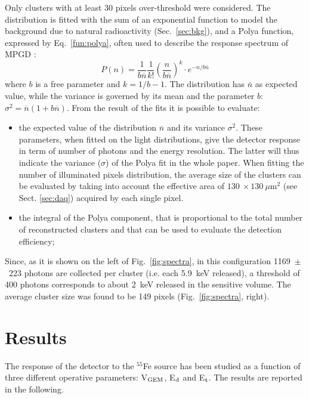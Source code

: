 \documentclass[a4paper]{jpconf}
\begin{document}
Only clusters with at least 30 pixels over-threshold were
considered. The distribution is fitted with the sum of an exponential
function to model the background due to natural radioactivity
(Sec.~\ref{sec:bkg}), and a Polya function, expressed by
Eq.~\ref{fun:polya}, often used to describe the response spectrum of
MPGD \cite{bib:rolandiblum}:
%
\begin{equation}
   P(n)=\frac{1}{b\overline{n}}\frac{1}{k!}\left(\frac{n}{b\overline{n}}\right)^k \cdot e^{-n/b\overline{n}}
\label{fun:polya}
\end{equation}
%
where $b$ is a free parameter and $k=1/b-1$. The distribution has $\overline{n}$ as expected value, while the variance is governed by its mean and the parameter $b$: $\sigma^2=\overline{n}(1+b\overline{n})$. 
From the result of the fits it is possible to evaluate:
\begin{itemize}
\item the expected value of the distribution $\overline{n}$ and its
  variance $\sigma^2$. These parameters, when fitted on the light
  distributions, give the detector response in term of number of
  photons and the energy resolution. The latter will thus indicate the
  variance ($\sigma$) of the Polya fit in the whole paper.  When
  fitting the number of illuminated pixels distribution, the average
  size of the clusters can be evaluated by taking into account the
  effective area of $130~\times 130~\mu$m$^2$ (see
  Sect. \ref{sec:daq}) acquired by each single pixel.
\item the integral of the Polya component, that is proportional to the
  total number of reconstructed clusters and that can be used to
  evaluate the detection efficiency;
\end{itemize}
Since, as it is shown on the left of Fig.~\ref{fig:spectra}, in this
configuration 1169~$\pm$~223 photons are collected per cluster
(i.e. each 5.9~keV released), a threshold of 400 photons corresponds
to about 2~keV released in the sensitive volume.  The average cluster
size was found to be 149 pixels (Fig.~\ref{fig:spectra}, right).

\section{Results}
The response of the detector to the $^{55}$Fe source has been studied
as a function of three different operative parameters: V$_{\rm GEM}$,
E$_{\rm d}$ and E$_{\rm t}$.  The results are reported in the
following.
\end{document}
